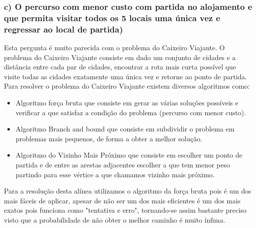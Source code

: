 \documentclass[12pt]{article}
\begin{document}
     \subsubsection{c) O percurso com menor custo com partida no alojamento e que permita visitar todos os 5 locais uma única vez e regressar ao local de partida)}
     
    \noindent Esta pergunta é muito parecida com o problema do Caixeiro Viajante.
    O problema do Caixeiro Viajante consiste em dado um conjunto de cidades e a distância entre cada par de cidades, encontrar a rota mais curta possível que visite todas as cidades exatamente uma única vez e retorne ao ponto de partida.\\
    Para resolver o problema do Caixeiro Viajante existem diversos algoritmos como:
\begin{itemize}
\item Algoritmo força bruta que consiste em gerar as várias soluções possíveis e verificar a que satisfaz a condição do problema (percurso com menor custo).
\item Algoritmo Branch and bound que consiste em subdividir o problema  em problemas mais pequenos, de forma a obter a melhor solução.
\item Algoritmo do Vizinho Mais Próximo que consiste em escolher um ponto de partida e de entre as arestas adjacentes escolher a que tem menor peso partindo para esse vértice a que chamamos vizinho mais próximo.
\end{itemize} 
    
    \noindent Para a resolução desta alínea utilizamos o algoritmo da força bruta pois é um dos mais fáceis de aplicar, apesar de não ser um dos mais eficientes é um dos mais exatos pois funciona como "tentativa e erro", tornando-se assim bastante preciso visto que a probabilidade de não obter o melhor caminho é muito ínfima.
\end{document}

